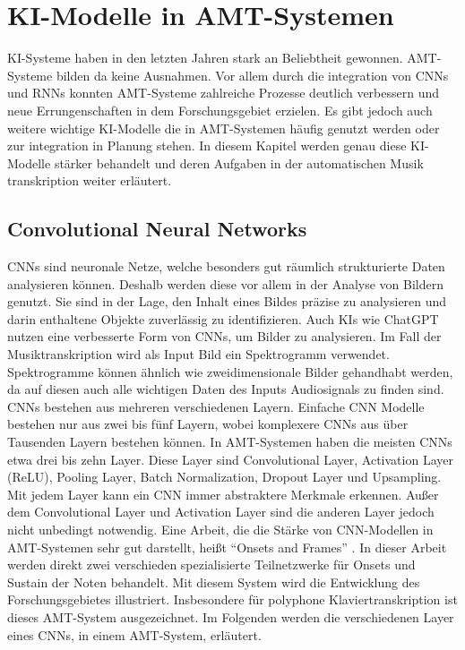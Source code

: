 \usepackage{csquotes}\section{KI-Modelle in AMT-Systemen}
\label{sec:ki_integration}
KI-Systeme haben in den letzten Jahren stark an Beliebtheit gewonnen.
AMT-Systeme bilden da keine Ausnahmen.
Vor allem durch die integration von CNNs und RNNs konnten AMT-Systeme zahlreiche Prozesse deutlich verbessern
und neue Errungenschaften in dem Forschungsgebiet erzielen.
Es gibt jedoch auch weitere wichtige KI-Modelle die in AMT-Systemen häufig genutzt werden
oder zur integration in Planung stehen.
In diesem Kapitel werden genau diese KI-Modelle stärker behandelt
und deren Aufgaben in der automatischen Musik transkription weiter erläutert.

\subsection{Convolutional Neural Networks}
CNNs sind neuronale Netze, welche besonders gut räumlich strukturierte Daten analysieren können.
Deshalb werden diese vor allem in der Analyse von Bildern genutzt.
Sie sind in der Lage, den Inhalt eines Bildes präzise zu analysieren und darin enthaltene Objekte zuverlässig zu identifizieren.
Auch KIs wie ChatGPT nutzen eine verbesserte Form von CNNs, um Bilder zu analysieren.
Im Fall der Musiktranskription wird als Input Bild ein Spektrogramm verwendet.
Spektrogramme können ähnlich wie zweidimensionale Bilder gehandhabt werden,
da auf diesen auch alle wichtigen Daten des Inputs Audiosignals zu finden sind.
CNNs bestehen aus mehreren verschiedenen Layern.
Einfache CNN Modelle bestehen nur aus zwei bis fünf Layern,
wobei komplexere CNNs aus über Tausenden Layern bestehen können.
In AMT-Systemen haben die meisten CNNs etwa drei bis zehn Layer.
Diese Layer sind Convolutional Layer, Activation Layer (ReLU), Pooling Layer,
Batch Normalization, Dropout Layer und Upsampling.
Mit jedem Layer kann ein CNN immer abstraktere Merkmale erkennen.
Außer dem Convolutional Layer und Activation Layer sind die anderen Layer jedoch nicht unbedingt notwendig.
Eine Arbeit, die die Stärke von CNN-Modellen in AMT-Systemen sehr gut darstellt, heißt \enquote{Onsets and Frames} \cite{hawthorne2017onsets}.
In dieser Arbeit werden direkt zwei verschieden spezialisierte Teilnetzwerke für Onsets und Sustain der Noten behandelt.
Mit diesem System wird die Entwicklung des Forschungsgebietes illustriert.
Insbesondere für polyphone Klaviertranskription ist dieses AMT-System ausgezeichnet.
Im Folgenden werden die verschiedenen Layer eines CNNs, in einem AMT-System, erläutert.

